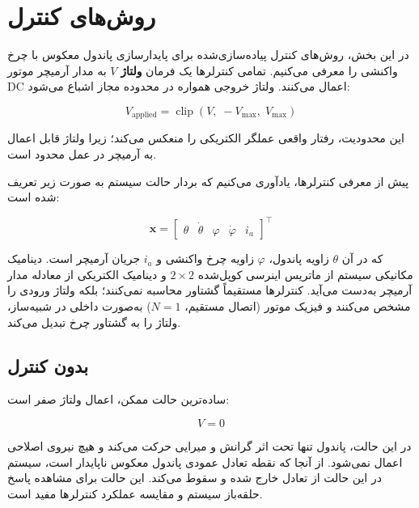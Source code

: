 \section{روش‌های کنترل}
\label{sec:controllers}

در این بخش، روش‌های کنترل پیاده‌سازی‌شده برای پایدارسازی پاندول معکوس با چرخ واکنشی را معرفی می‌کنیم. تمامی کنترلرها یک فرمان \textbf{ولتاژ} $V$ به مدار آرمیچر موتور DC اعمال می‌کنند. ولتاژ خروجی همواره در محدوده مجاز اشباع می‌شود:

\begin{equation}
V_{\text{applied}} = \operatorname{clip}(V,\; -V_{\max},\; V_{\max})
\end{equation}

این محدودیت، رفتار واقعی عملگر الکتریکی را منعکس می‌کند؛ زیرا ولتاژ قابل اعمال به آرمیچر در عمل محدود است.

پیش از معرفی کنترلرها، یادآوری می‌کنیم که بردار حالت سیستم به صورت زیر تعریف شده است:

\begin{equation}
\mathbf{x} = \begin{bmatrix} \theta & \dot{\theta} & \varphi & \dot{\varphi} & i_a \end{bmatrix}^\top
\end{equation}

که در آن $\theta$ زاویه پاندول، $\varphi$ زاویه چرخ واکنشی و $i_a$ جریان آرمیچر است. دینامیک مکانیکی سیستم از ماتریس اینرسی کوپل‌شده $2 \times 2$ و دینامیک الکتریکی از معادله مدار آرمیچر به‌دست می‌آید. کنترلرها مستقیماً گشتاور محاسبه نمی‌کنند؛ بلکه ولتاژ ورودی را مشخص می‌کنند و فیزیک موتور (اتصال مستقیم، $N=1$) به‌صورت داخلی در شبیه‌ساز، ولتاژ را به گشتاور چرخ تبدیل می‌کند.

\subsection{بدون کنترل}

ساده‌ترین حالت ممکن، اعمال ولتاژ صفر است:

\begin{equation}
V = 0
\end{equation}

در این حالت، پاندول تنها تحت اثر گرانش و میرایی حرکت می‌کند و هیچ نیروی اصلاحی اعمال نمی‌شود. از آنجا که نقطه تعادل عمودی پاندول معکوس ناپایدار است، سیستم در این حالت از تعادل خارج شده و سقوط می‌کند. این حالت برای مشاهده پاسخ حلقه‌باز سیستم و مقایسه عملکرد کنترلرها مفید است.

